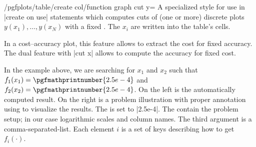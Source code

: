 \documentclass[a4paper]{ltxdoc}
\begin{document}
\begin{stylekey}{/pgfplots/table/create col/function graph cut y=}
    A specialized style for use in |create on use| statements which computes
    cuts of (one or more) discrete plots $y(x_1), \dotsc, y(x_N)$ with a fixed
    . The $x_i$ are written into the table's cells.

    In a cost--accuracy plot, this feature allows to extract the cost for fixed
    accuracy. The dual feature with |cut x| allows to compute the accuracy for
    fixed cost.
    \pgfplotsset{anchor=center,/tikz/baseline}
\begin{codeexample}[]
    \loadedtable

\pgfplotstabletypeset{\loadedtable}

\end{codeexample}
    In the example above, we are searching for $x_1$ and $x_2$ such that
    $f_1(x_1) = \pgfmathprintnumber{2.5e-4}$ and $f_2(x_2)
    =\pgfmathprintnumber{2.5e-4}$. On the left is the automatically computed
    result. On the right is a problem illustration with proper annotation using
    \PGFPlots{} to visualize the results. The  is set to
    |2.5e-4|. The  contain the problem setup; in our case
    logarithmic scales and column names. The third argument is a
    comma-separated-list. Each element $i$ is a set of keys describing how to
    get $f_i(\cdot)$.


\end{stylekey}
\end{document}
